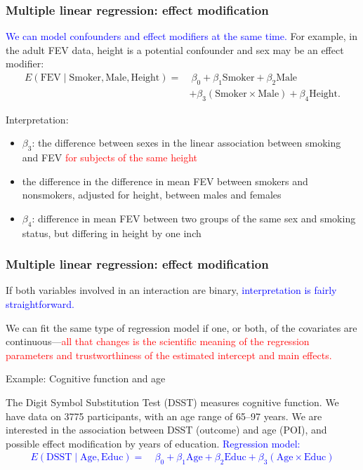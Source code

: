 \documentclass[12pt, 
hyperref={colorlinks=true, linkcolor=blue, urlcolor=cyan},dvipsnames]{beamer}
\begin{document}
\begin{frame}
\frametitle{Multiple linear regression: effect modification}

\textcolor{blue}{We can model confounders and effect modifiers at the same time.} For example, in the adult FEV data, height is a potential confounder and sex may be an effect modifier:
\begin{align*}
E(\text{FEV} \mid \text{Smoker}, \text{Male}, \text{Height}) = & \ \beta_0 + \beta_1 \text{Smoker} + \beta_2 \text{Male}\\
& + \beta_3 (\text{Smoker} \times \text{Male}) + \beta_4 \text{Height}.
\end{align*}

Interpretation: \vspace{-0.2cm}
\begin{itemize}
\item $\beta_3$: the difference between sexes in the linear association between smoking and FEV \textcolor{red}{for subjects of the same height}
\item[] the difference in the difference in mean FEV between smokers and nonsmokers, adjusted for height, between males and females
\item $\beta_4$: difference in mean FEV between two groups of the same sex and smoking status, but differing in height by one inch
\end{itemize}
\end{frame}

\begin{frame}
\frametitle{Multiple linear regression: effect modification}

If both variables involved in an interaction are binary, \textcolor{blue}{interpretation is fairly straightforward.}

We can fit the same type of regression model if one, or both, of the covariates are continuous---\textcolor{red}{all that changes is the scientific meaning of the regression parameters and trustworthiness of the estimated intercept and main effects.}

Example: Cognitive function and age

The Digit Symbol Substitution Test (DSST) measures cognitive function. We have data on 3775 participants, with an age range of 65--97 years. We are interested in the association between DSST (outcome) and age (POI), and possible effect modification by years of education. \textcolor{blue}{Regression model: 
\begin{align*}
E(\text{DSST} \mid \text{Age}, \text{Educ}) =& \ \beta_0 + \beta_1 \text{Age} + \beta_2 \text{Educ} + \beta_3 (\text{Age} \times \text{Educ})
\end{align*}
}
\end{frame}
\end{document}
